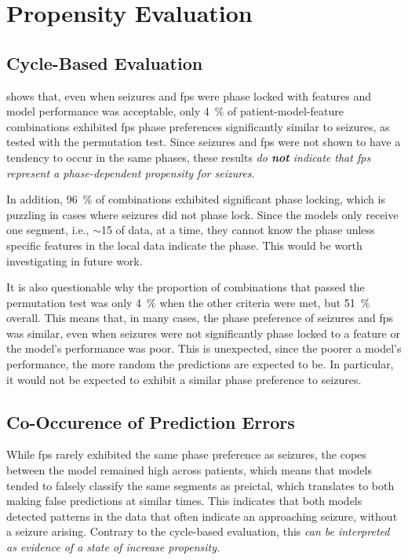 \section{Propensity Evaluation}\label{sec:discussion-propensity-evaluation}

\subsection{Cycle-Based Evaluation}
 shows that, even when seizures and \glspl{fp} were phase locked with features and model performance was acceptable, only \SI{4}{\percent} of patient-model-feature combinations exhibited \glspl{fp} phase preferences significantly similar to seizures, as tested with the permutation test.
Since seizures and \glspl{fp} were not shown to have a tendency to occur in the same phases, these results \textit{do \textbf{not} indicate that \glspl{fp} represent a phase-dependent propensity for seizures}.

In addition, \SI{96}{\percent} of combinations exhibited significant phase locking, which is puzzling in cases where seizures did not phase lock.
Since the models only receive one segment, i.e., $\sim$\SI{15}{\sec} of data, at a time, they cannot know the phase unless specific features in the local data indicate the phase.
This would be worth investigating in future work.

It is also questionable why the proportion of combinations that passed the permutation test was only \SI{4}{\percent} when the other criteria were met, but \SI{51}{\percent} overall.
This means that, in many cases, the phase preference of seizures and \glspl{fp} was similar, even when seizures were not significantly phase locked to a feature or the model's performance was poor.
This is unexpected, since the poorer a model's performance, the more random the predictions are expected to be.
In particular, it would not be expected to exhibit a similar phase preference to seizures.

\subsection{Co-Occurence of Prediction Errors}
While \glspl{fp} rarely exhibited the same phase preference as seizures, the \glspl{cope} between the model remained high across patients, which means that models tended to falsely classify the same segments as preictal, which translates to both making false predictions at similar times.
This indicates that both models detected patterns in the data that often indicate an approaching seizure, without a seizure arising.
Contrary to the cycle-based evaluation, this \textit{can be interpreted as evidence of a state of increase propensity.}

